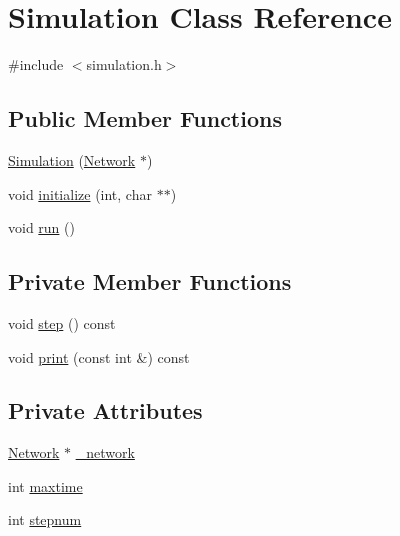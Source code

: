 \hypertarget{classSimulation}{}\section{Simulation Class Reference}
\label{classSimulation}


{\ttfamily \#include $<$simulation.\+h$>$}

\subsection*{Public Member Functions}
\begin{DoxyCompactItemize}
\item 
\mbox{\hyperlink{classSimulation_a7441762ef8cc50b5d9a8f44c247a1116}{Simulation}} (\mbox{\hyperlink{classNetwork}{Network}} $\ast$)
\item 
void \mbox{\hyperlink{classSimulation_a348e5955b3c7937d21fc851cad347eb8}{initialize}} (int, char $\ast$$\ast$)
\item 
void \mbox{\hyperlink{classSimulation_ae5c367f87c0b5dc9740bc6d00e44e72c}{run}} ()
\end{DoxyCompactItemize}
\subsection*{Private Member Functions}
\begin{DoxyCompactItemize}
\item 
void \mbox{\hyperlink{classSimulation_a49899e122ecc9f0eaba8d40182030d24}{step}} () const
\item 
void \mbox{\hyperlink{classSimulation_a261acbceff8d384ea12cb010798504b2}{print}} (const int \&) const
\end{DoxyCompactItemize}
\subsection*{Private Attributes}
\begin{DoxyCompactItemize}
\item 
\mbox{\hyperlink{classNetwork}{Network}} $\ast$ \mbox{\hyperlink{classSimulation_a5f1d8152b13bc4640c8a3fddcfe7eae9}{\+\_\+network}}
\item 
int \mbox{\hyperlink{classSimulation_a2db45338d73f8e7823eb85015532be23}{maxtime}}
\item 
int \mbox{\hyperlink{classSimulation_a6bfba2071d6358af042ca417637c6c36}{stepnum}}
\end{DoxyCompactItemize}


